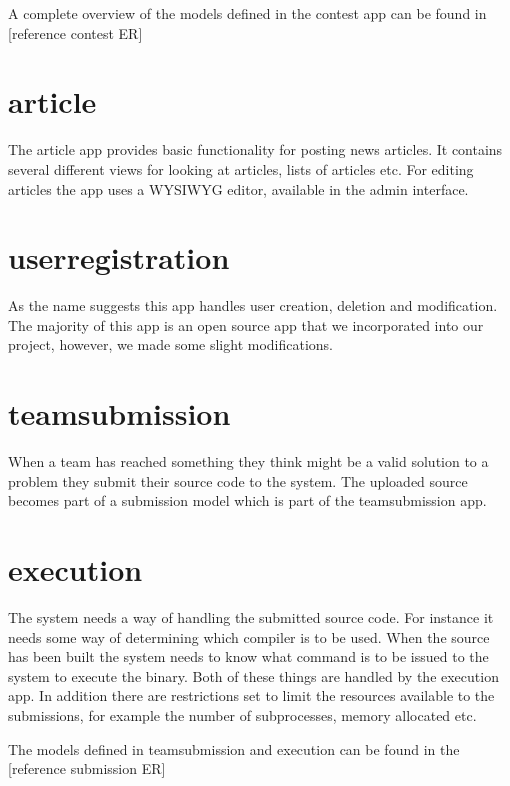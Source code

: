 \bigskip

A complete overview of the models defined in the contest app can be
found in [reference contest ER]


\bigskip

\section{article}
The article app provides basic functionality for posting news articles.
It contains several different views for looking at articles, lists of
articles etc. For editing articles the app uses a WYSIWYG editor,
available in the admin interface. 

\section{userregistration}
As the name suggests this app handles user creation, deletion and
modification. The majority of this app is an open source app that we
incorporated into our project, however, we made some slight
modifications. 

\section{teamsubmission}
When a team has reached something they think might be a valid solution
to a problem they submit their source code to the system. The uploaded
source becomes part of a submission model which is part of the
teamsubmission app. 

\section{execution}
The system needs a way of handling the submitted source code. For
instance it needs some way of determining which compiler is to be used.
When the source has been built the system needs to know what command is
to be issued to the system to execute the binary. Both of these things
are handled by the execution app. In addition there are restrictions
set to limit the resources available to the submissions, for example
the number of subprocesses, memory allocated etc.


\bigskip

The models defined in teamsubmission and execution can be found in the
[reference submission ER]


